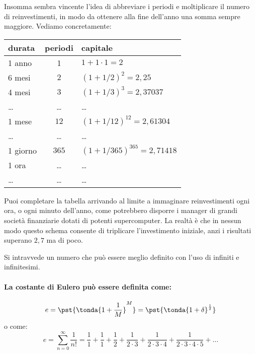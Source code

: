 Insomma sembra vincente l'idea di abbreviare i periodi e moltiplicare il numero 
di reinvestimenti, in modo da ottenere alla fine dell'anno una somma sempre 
maggiore. Vediamo concretamente:

\noindent\begin{minipage}{0.53\textwidth}
\begin{center}
   \begin{tabular}{l|c|l}
    durata & periodi  & capitale \\
    \hline
     1 anno& 1 & \(1+1\cdot1=2\) \\
     6 mesi  & \(2\) & \((1+1/2)^2=2,25\) \\
     4 mesi  & \(3\) &  \((1+1/3)^3=2,37037\) \\ 
     \dots & \dots & \dots \\
     1 mese  & \(12\) &  \((1+1/12)^{12}=2,61304\) \\
    \dots & \dots & \dots \\
     1 giorno &\(365\) &  \((1+1/365)^{365}=2,71418\)\\ 
     1 ora & \dots & \dots \\
     \dots & \dots & \dots \\
     \hline 
   \end{tabular}
\end{center}
\end{minipage}
\hfill
\begin{minipage}{0.45\textwidth}
Puoi completare la tabella arrivando al limite a immaginare reinvestimenti 
ogni ora, o ogni minuto dell'anno, come potrebbero disporre i manager di 
grandi società finanziarie dotati di potenti supercomputer. La realtà è che in 
nessun modo questo schema consente di triplicare l'investimento iniziale, anzi 
i risultati superano \(2,7\) ma di poco. \\
\end{minipage}

Si intravvede un numero che può 
essere meglio definito con l'uso di infiniti e infinitesimi.
\paragraph{La costante di Eulero può essere definita come:}
\[e = \pst{\tonda{1+\frac{1}{M}}^M} = 
\pst{\tonda{1+\delta}^\frac{1}{\delta}} 
\]
o come:
\[e=\sum_{n=0}^{\infty}{\frac{1}{n!}}=
\frac{1}{1}+\frac{1}{1}+\frac{1}{2}+\frac{1}{2\cdot3}+
\frac{1}{2\cdot3\cdot4}+\frac{1}{2\cdot3\cdot4\cdot5}+\dots\]

